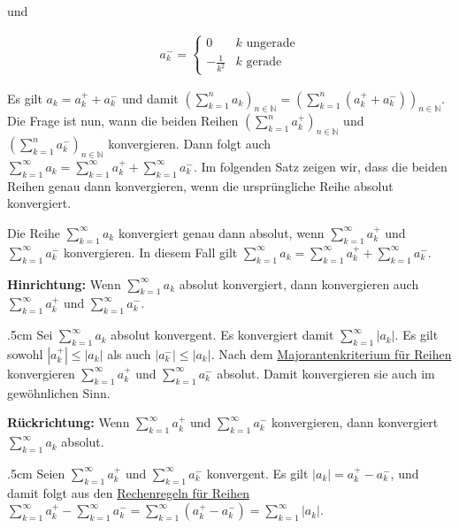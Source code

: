 \documentclass[fontsize=9pt,
               parskip=half-,
               DIV=14,
               listof=chapterentry,
               tocflat]{scrbook}
\newenvironment{indentblock}{\begin{adjustwidth}{.5cm}{}}{\end{adjustwidth}}
\newcommand{\proofstep}[1]{\textbf{\textcolor{sblau}{#1}}}
\begin{document}
und

\begin{align*}
a_{k}^{-}={\begin{cases}0&k{\text{ ungerade}}\\-{\tfrac {1}{k^{2}}}&k{\text{ gerade}}\end{cases}}
\end{align*}

Es gilt $a_{k}=a_{k}^{+}+a_{k}^{-}$ und damit $\left(\sum _{k=1}^{n}a_{k}\right)_{n\in \mathbb {N} }=\left(\sum _{k=1}^{n}(a_{k}^{+}+a_{k}^{-})\right)_{n\in \mathbb {N} }$. Die Frage ist nun, wann die beiden Reihen $\left(\sum _{k=1}^{n}a_{k}^{+}\right)_{n\in \mathbb {N} }$ und $\left(\sum _{k=1}^{n}a_{k}^{-}\right)_{n\in \mathbb {N} }$ konvergieren. Dann folgt auch $\sum _{k=1}^{\infty }a_{k}=\sum _{k=1}^{\infty }a_{k}^{+}+\sum _{k=1}^{\infty }a_{k}^{-}$. Im folgenden Satz zeigen wir, dass die beiden Reihen genau dann konvergieren, wenn die ursprüngliche Reihe absolut konvergiert.

\begin{theorem*}
Die Reihe $\sum _{k=1}^{\infty }a_{k}$ konvergiert genau dann absolut, wenn $\sum _{k=1}^{\infty }a_{k}^{+}$ und $\sum _{k=1}^{\infty }a_{k}^{-}$ konvergieren. In diesem Fall gilt $\sum _{k=1}^{\infty }a_{k}=\sum _{k=1}^{\infty }a_{k}^{+}+\sum _{k=1}^{\infty }a_{k}^{-}$.

\end{theorem*}
\clearpage
\begin{proof*}
\proofstep{Hinrichtung:}
 Wenn $\sum _{k=1}^{\infty }a_{k}$ absolut konvergiert, dann konvergieren auch $\sum _{k=1}^{\infty }a_{k}^{+}$ und $\sum _{k=1}^{\infty }a_{k}^{-}$.\begin{indentblock}
Sei $\sum _{k=1}^{\infty }a_{k}$ absolut konvergent. Es konvergiert damit $\sum _{k=1}^{\infty }|a_{k}|$. Es gilt sowohl $|a_{k}^{+}|\leq |a_{k}|$ als auch $|a_{k}^{-}|\leq |a_{k}|$. Nach dem \href{https://de.wikibooks.org/wiki/Mathe\_für\_Nicht-Freaks:\_Majorantenkriterium\_und\_Minorantenkriterium}
{Majorantenkriterium für Reihen} konvergieren $\sum _{k=1}^{\infty }a_{k}^{+}$ und $\sum _{k=1}^{\infty }a_{k}^{-}$ absolut. Damit konvergieren sie auch im gewöhnlichen Sinn.

\end{indentblock}

\proofstep{Rückrichtung:}
 Wenn $\sum _{k=1}^{\infty }a_{k}^{+}$ und $\sum _{k=1}^{\infty }a_{k}^{-}$ konvergieren, dann konvergiert $\sum _{k=1}^{\infty }a_{k}$ absolut.\begin{indentblock}
Seien $\sum _{k=1}^{\infty }a_{k}^{+}$ und $\sum _{k=1}^{\infty }a_{k}^{-}$ konvergent. Es gilt $|a_{k}|=a_{k}^{+}-a_{k}^{-}$, und damit folgt aus den \href{https://de.wikibooks.org/wiki/Mathe\_für\_Nicht-Freaks:\_Rechenregeln\_für\_Reihen}
{Rechenregeln für Reihen} $\sum _{k=1}^{\infty }a_{k}^{+}-\sum _{k=1}^{\infty }a_{k}^{-}=\sum _{k=1}^{\infty }(a_{k}^{+}-a_{k}^{-})=\sum _{k=1}^{\infty }|a_{k}|$.

\end{indentblock}

\end{proof*}
\end{document}
